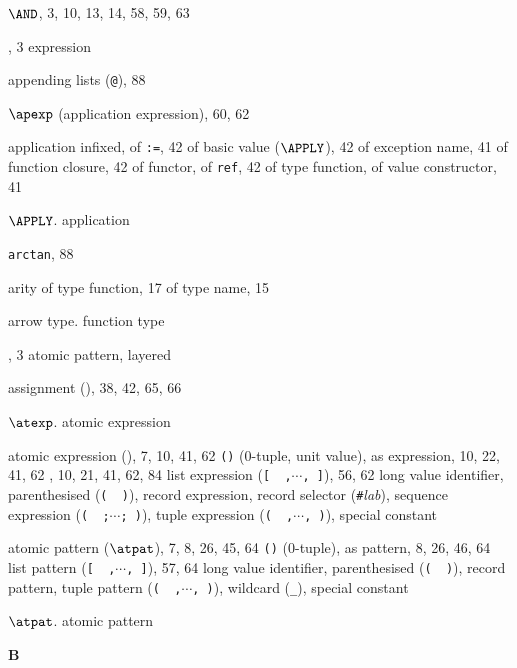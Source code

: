 \begin{theindex}
\item $\AND$, 3, 10, 13, 14, 58, 59, 63 
\item \ANDALSO, 3
\subitem\seealso expression
\item appending lists (\verb+@+), 88
\item $\apexp$ (application expression), 60, 62
\item application
\subitem infixed, \infixapplrefs
\subitem of {\tt :=}, 42
\subitem of basic value ($\APPLY$), 42
\subitem of exception name, 41
\subitem of function closure, 42
\subitem of functor, \funcapprefs
\subitem of {\tt ref}, 42
\subitem of type function, \typefunctionrefs
\subitem of value constructor, 41
\item $\APPLY$. \see application 
\item {\tt arctan}, 88
\item arity 
\subitem of type function, 17
\subitem of type name, 15
\item arrow type. \see function type
\item \AS, 3
\subitem \seealso atomic pattern, layered
\item assignment (\ml{:=}), 38, 42, 65, 66
\item $\atexp$. \see atomic expression
\item atomic expression (\atexp), 7, 10, 41, 62
\subitem \verb+()+ (0-tuple, unit value), \zeroexptuplerefs
\subitem as expression, 10, 22, 41, 62
\subitem {}, 10, 21, 41, 62, 84
\subitem list expression  (\verb+[  ,+$\cdots$\verb+, ]+), 56, 62
\subitem long value identifier, \vidinatexprefs
\subitem parenthesised (\verb+(  )+), \parexprefs
\subitem record expression, \recordexprefs
\subitem record selector (\verb+#+{\it lab}), \hashrefs
\subitem sequence expression  (\verb+(  ;+$\cdots$\verb+; )+), \sequenceexprefs
\subitem tuple expression (\verb+(  ,+$\cdots$\verb+, )+), \tupleexprefs
\subitem \seealso special constant
\item atomic pattern ($\atpat$), 7, 8, 26, 45, 64
\subitem \verb+()+ (0-tuple), \zeropattuplerefs
\subitem as pattern, 8, 26, 46, 64
\subitem list pattern (\verb+[  ,+$\cdots$\verb+, ]+), 57, 64
\subitem long value identifier, \vidinatpatrefs
\subitem parenthesised (\verb+(  )+), \parpatrefs
\subitem record pattern, \recordpatrefs
\subitem tuple pattern (\verb+(  ,+$\cdots$\verb+, )+), \tuplepatrefs
\subitem wildcard (\verb+_+),  \underscorewildrefs
\subitem \seealso special constant
\item $\atpat$. \see atomic pattern
\indexspace
\parbox{64mm}{\hfil{\large\bf B}\hfil}

\end{theindex}

